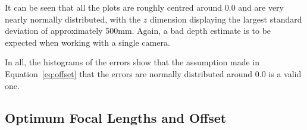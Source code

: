 
It can be seen that all the plots are roughly centred around 0.0 and are very nearly normally distributed, with the $z$ dimension displaying the largest standard deviation of approximately 500mm. Again, a bad depth estimate is to be expected when working with a single camera.

In all, the histograms of the errors show that the assumption made in Equation~\ref{eq:offset} that the errors are normally distributed around 0.0 is a valid one. 

\subsection{Optimum Focal Lengths and Offset}

